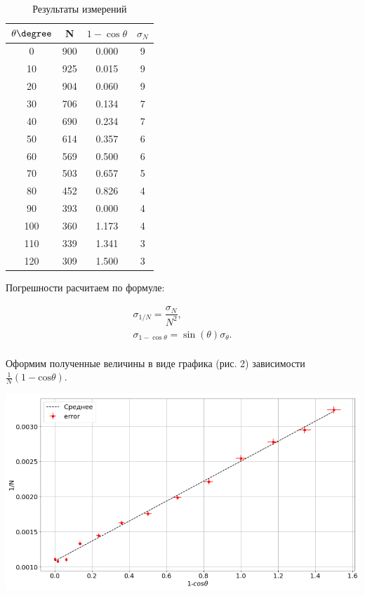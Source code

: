\documentclass[14pt,a4paper]{scrartcl}
\begin{document}
\begin{table}[h]
  \centering
  \begin{tabular}{ | c | c | c | c |}
  \hline
  $\theta \degree$ & N & $1 - \cos\theta$ & $\sigma_N$ \\ \hline 
   0 &  900 &  0.000 & 9 \\ \hline
   10 & 925 & 0.015 & 9 \\ \hline
   20 & 904 & 0.060 & 9 \\ \hline
   30 & 706 & 0.134 & 7 \\ \hline
   40 & 690 & 0.234 & 7 \\ \hline
   50 & 614 & 0.357 & 6 \\ \hline
   60 & 569 & 0.500 & 6 \\ \hline
   70 & 503 & 0.657 & 5 \\ \hline
   80 & 452 & 0.826 & 4\\ \hline
   90 & 393 & 0.000 & 4\\ \hline
   100 & 360 & 1.173 & 4\\ \hline
   110 & 339 & 1.341 & 3\\ \hline
   120 & 309 & 1.500 & 3\\ \hline  
  \end{tabular}
  \caption{Результаты измерений}
\end{table}

Погрешности расчитаем по формуле: 

\[\begin{array}{l}
\sigma_{1/N} = \dfrac{\sigma_N}{N^2},\\
\sigma_{1-\cos \theta} = \sin(\theta) \sigma_\theta.\\
\end{array}\]


Оформим полученные величины в виде графика (рис. 2) зависимости $\frac{1}{N}(1-\mathrm{cos}\theta)$.

\begin{center}
\includegraphics[scale=0.5]{1234.png}\newline
\caption{Рис.2. График зависимости $\frac{1}{N(\theta)}$ от $1-\mathrm{cos}\theta$}
\end{center}
\end{document}
